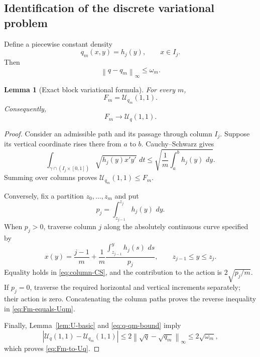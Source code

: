 \documentclass[11pt]{article}
\newtheorem{lemma}[theorem]{Lemma}
\theoremstyle{remark}
\newcommand{\dd}{\,d}
\newcommand{\calU}{\mathcal U}
\newcommand{\norm}[1]{\left\lVert #1\right\rVert}
\begin{document}
\subsection{Identification of the discrete variational problem}

Define a piecewise constant density
\begin{equation}\label{eq:qm-def}
        q_m(x,y)=h_j(y),
        \qquad x\in I_j.
\end{equation}
Then
\begin{equation}\label{eq:q-qm-bound}
        \norm{q-q_m}_\infty\le\omega_m.
\end{equation}

\begin{lemma}[Exact block variational formula]\label{lem:block-variational}
For every $m$,
\begin{equation}\label{eq:Fm-equals-Uqm}
        F_m=\calU_{q_m}(1,1).
\end{equation}
Consequently,
\begin{equation}\label{eq:Fm-to-Uq}
        F_m\longrightarrow\calU_q(1,1).
\end{equation}
\end{lemma}

\begin{proof}
Consider an admissible path and its passage through column $I_j$.  Suppose its
vertical coordinate rises there from $a$ to $b$.  Cauchy--Schwarz gives
\begin{equation}\label{eq:column-CS}
 \int_{\gamma\cap(I_j\times[0,1])}
 \sqrt{h_j(y)x'y'}\,\dd t
 \le
 \sqrt{\frac1m\int_a^bh_j(y)\,\dd y}.
\end{equation}
Summing over columns proves $\calU_{q_m}(1,1)\le F_m$.

Conversely, fix a partition $z_0,\dots,z_m$ and put
\[
        p_j=\int_{z_{j-1}}^{z_j}h_j(y)\,\dd y.
\]
When $p_j>0$, traverse column $j$ along the absolutely continuous curve
specified by
\[
 x(y)=\frac{j-1}{m}
      +\frac1m\frac{\int_{z_{j-1}}^yh_j(s)\,\dd s}{p_j},
 \qquad z_{j-1}\le y\le z_j.
\]
Equality holds in \eqref{eq:column-CS}, and the contribution to the action is
$2\sqrt{p_j/m}$.  If $p_j=0$, traverse the required horizontal and vertical
increments separately; their action is zero.  Concatenating the column paths
proves the reverse inequality in \eqref{eq:Fm-equals-Uqm}.

Finally, Lemma~\ref{lem:U-basic} and \eqref{eq:q-qm-bound} imply
\[
 |\calU_q(1,1)-\calU_{q_m}(1,1)|
 \le2\norm{\sqrt q-\sqrt{q_m}}_\infty
 \le2\sqrt{\omega_m},
\]
which proves \eqref{eq:Fm-to-Uq}.
\end{proof}
\end{document}
